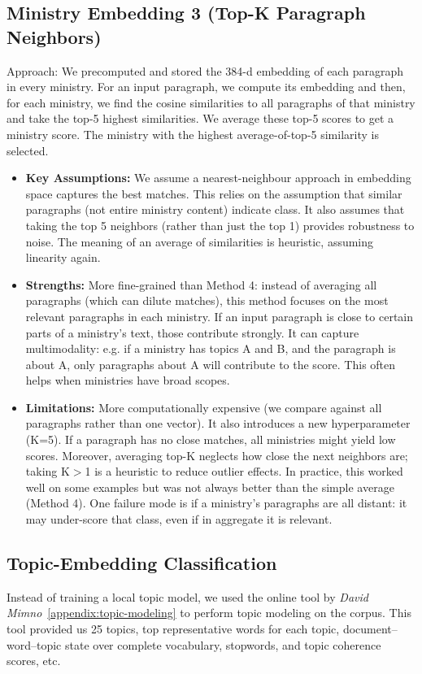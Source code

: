 \documentclass{report}
\begin{document}
\subsection{Ministry Embedding 3 (Top-K Paragraph Neighbors)}
Approach: We precomputed and stored the 384-d embedding of each paragraph in every ministry. For an input paragraph, we compute its embedding and then, for each ministry, we find the cosine similarities to all paragraphs of that ministry and take the top-5 highest similarities. We average these top-5 scores to get a ministry score. The ministry with the highest average-of-top-5 similarity is selected.

\begin{itemize}
    \item \textbf{Key Assumptions:} We assume a nearest-neighbour approach in embedding space captures the best matches. This relies on the assumption that similar paragraphs (not entire ministry content) indicate class. It also assumes that taking the top 5 neighbors (rather than just the top 1) provides robustness to noise. The meaning of an average of similarities is heuristic, assuming linearity again.
    \item \textbf{Strengths:} More fine-grained than Method 4: instead of averaging all paragraphs (which can dilute matches), this method focuses on the most relevant paragraphs in each ministry. If an input paragraph is close to certain parts of a ministry's text, those contribute strongly. It can capture multimodality: e.g. if a ministry has topics A and B, and the paragraph is about A, only paragraphs about A will contribute to the score. This often helps when ministries have broad scopes.
    \item \textbf{Limitations:} More computationally expensive (we compare against all paragraphs rather than one vector). It also introduces a new hyperparameter (K=5). If a paragraph has no close matches, all ministries might yield low scores. Moreover, averaging top-K neglects how close the next neighbors are; taking K$>$1 is a heuristic to reduce outlier effects. In practice, this worked well on some examples but was not always better than the simple average (Method 4). One failure mode is if a ministry's paragraphs are all distant: it may under-score that class, even if in aggregate it is relevant.
\end{itemize}

\subsection{Topic-Embedding Classification}
Instead of training a local topic model, we used the online tool by \textit{David Mimno}~\ref{appendix:topic-modeling} to perform topic modeling on the corpus. This tool provided us 25 topics, top representative words for each topic, document–word–topic state over complete vocabulary, stopwords, and topic coherence scores, etc.
\end{document}
